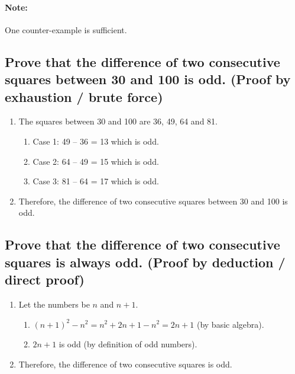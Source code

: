\documentclass{article}
\begin{document}
\paragraph{Note:}One counter-example is sufficient. 
\vspace{0.1cm}

\subsection*{Prove that the difference of two consecutive squares between 30 and 100 is odd. (Proof by exhaustion / brute force)}
\begin{enumerate}
    \item The squares between 30 and 100 are 36, 49, 64 and 81.
    \begin{enumerate}
        \item Case 1: 49 – 36 = 13 which is odd.
        \item Case 2: 64 – 49 = 15 which is odd.
        \item Case 3: 81 – 64 = 17 which is odd.
    \end{enumerate}
    \item Therefore, the difference of two consecutive squares
between 30 and 100 is odd.
\end{enumerate}
\vspace{0.1cm}

\subsection*{Prove that the difference of two consecutive squares is always odd. (Proof by deduction / direct proof)}
\begin{enumerate}
    \item Let the numbers be $n$ and $n+1$.
    \begin{enumerate}
        \item $(n+1)^2-n^2=n^2+2n+1-n^2=2n+1$ (by basic algebra).
        \item $2n+1$ is odd (by definition of odd numbers).
    \end{enumerate}
    \item Therefore, the difference of two consecutive squares is odd.
\end{enumerate}
\vspace{0.1cm}
\end{document}

